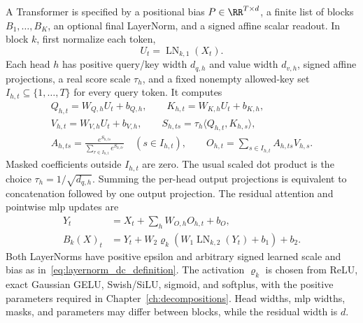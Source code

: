 \begin{definition}\label{def:prenorm_transformer}
A Transformer is specified by a positional bias $P\in\RR^{T\times d}$, a finite list of blocks $B_1,\dots,B_K$, an optional final LayerNorm, and a signed affine scalar readout. In block $k$, first normalize each token,
\begin{equation*}
    U_t=\operatorname{LN}_{k,1}(X_t).
\end{equation*}
Each head $h$ has positive query/key width $d_{q,h}$ and value width $d_{v,h}$, signed affine projections, a real score scale $\tau_h$, and a fixed nonempty allowed-key set $I_{h,t}\subseteq\{1,\dots,T\}$ for every query token. It computes
\begin{equation}
\begin{gathered}
    Q_{h,t}=W_{Q,h}U_t+b_{Q,h},\qquad
    K_{h,t}=W_{K,h}U_t+b_{K,h},\\
    V_{h,t}=W_{V,h}U_t+b_{V,h},\qquad
    S_{h,ts}=\tau_h\langle Q_{h,t},K_{h,s}\rangle,\\
    A_{h,ts}=\frac{e^{S_{h,ts}}}{\sum_{r\in I_{h,t}}e^{S_{h,tr}}}
       \quad(s\in I_{h,t}),\qquad
    O_{h,t}=\sum_{s\in I_{h,t}}A_{h,ts}V_{h,s}.
\end{gathered}
    \label{eq:explicit_transformer_attention}
\end{equation}
Masked coefficients outside $I_{h,t}$ are zero. The usual scaled dot product is the choice $\tau_h=1/\sqrt{d_{q,h}}$. Summing the per-head output projections is equivalent to concatenation followed by one output projection. The residual attention and pointwise \ac{mlp} updates are
\begin{equation}
\begin{aligned}
    Y_t&=X_t+\sum_h W_{O,h}O_{h,t}+b_O,\\
    B_k(X)_t&=Y_t+W_2\varrho_k\!\left(W_1\operatorname{LN}_{k,2}(Y_t)+b_1\right)+b_2.
\end{aligned}
    \label{eq:explicit_transformer_block}
\end{equation}
Both LayerNorms have positive epsilon and arbitrary signed learned scale and bias as in~\eqref{eq:layernorm_dc_definition}. The activation $\varrho_k$ is chosen from ReLU, exact Gaussian GELU, Swish/SiLU, sigmoid, and softplus, with the positive parameters required in Chapter~\ref{ch:decompositions}. Head widths, \ac{mlp} widths, masks, and parameters may differ between blocks, while the residual width is $d$.


\end{definition}

